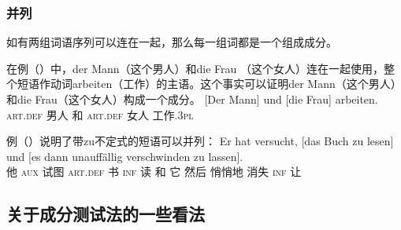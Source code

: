 \subsubsection{并列}

如有两组词语序列可以连在一起，那么每一组词都是一个组成成分。

在例（）中，der Mann（这个男人）和die Frau （这个女人）连在一起使用，整个短语作动词arbeiten（工作）的主语。这个事实可以证明der Mann（这个男人）和die Frau（这个女人）构成一个成分。
\ea
\gll {}[Der        Mann] und [die          Frau] arbeiten.\\
     \spacebr{}\textsc{art}.\textsc{def} 男人   和 \spacebr{}\textsc{art}.\textsc{def} 女人 工作.\textsc{3pl}\\
\z

例（）说明了带zu不定式的短语可以并列：
\ea
\gll Er hat versucht, [das Buch zu lesen] und [es dann unauffällig verschwinden zu lassen].\\
     他 \textsc{aux} 试图 \spacebr{}\textsc{art}.\textsc{def} 书 \textsc{inf} 读 和 \spacebr{}它 然后 悄悄地 消失 \textsc{inf} 让\\
\z

\subsection{关于成分测试法的一些看法}
\label{sec-status-der-ktests}

